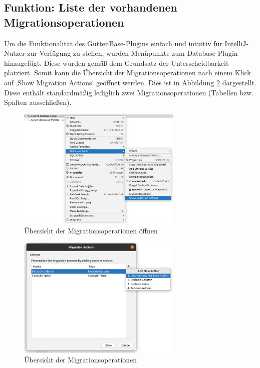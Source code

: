 \subsection{Funktion: Liste der vorhandenen Migrationsoperationen}

	Um die Funktionalität des GuttenBase-Plugins einfach und intuitiv für IntelliJ-Nutzer zur Verfügung zu stellen, wurden Menüpunkte zum Database-Plugin hinzugefügt. Diese wurden gemäß dem Grundsatz der Unterscheidbarkeit platziert. Somit kann die Übersicht der Migrationsoperationen nach einem Klick auf ,Show Migration Actions‘ geöffnet werden. Dies ist in Abbildung \ref{img:creategbaction} dargestellt. Diese enthält standardmäßig lediglich zwei Migrationsoperationen (Tabellen bzw. Spalten ausschließen).\\
	\begin{figure}[h]
		\centering
		\includegraphics[width=0.7\textwidth]{images/ui/dbactions}
		\caption{Übersicht der Migrationsoperationen öffnen}
		\label{img:dbactions}
	\end{figure}
	\begin{figure}[H]
		\centering
		\includegraphics[width=0.7\textwidth]{images/ui/creategbaction}
		\caption{Übersicht der Migrationsoperationen}
		\label{img:creategbaction}
	\end{figure}

